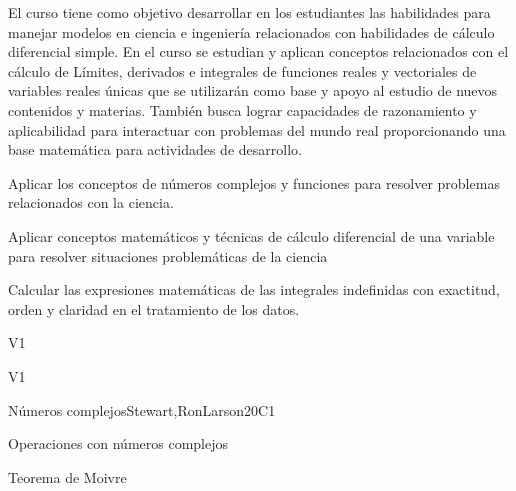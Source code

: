\begin{syllabus}


\begin{justification}
El curso tiene como objetivo desarrollar en los estudiantes las habilidades para manejar modelos en ciencia e ingeniería relacionados con habilidades de cálculo diferencial simple. En el curso se estudian y aplican conceptos relacionados con el cálculo de Límites, derivados e integrales de funciones reales y vectoriales de variables reales únicas que se utilizarán como base y
apoyo al estudio de nuevos contenidos y materias. También busca lograr capacidades de razonamiento y aplicabilidad para interactuar con problemas del mundo real proporcionando una base matemática para actividades de desarrollo.
\end{justification}

\begin{goals}
\item Aplicar los conceptos de números complejos y funciones para resolver problemas relacionados con la ciencia.
\item Aplicar conceptos matemáticos y técnicas de cálculo diferencial de una variable para resolver situaciones problemáticas de la ciencia
\item Calcular las expresiones matemáticas de las integrales indefinidas con exactitud, orden y claridad en el tratamiento de los datos.
\end{goals}

\begin{outcomes}{V1}
    \item {}
    \item {}
\end{outcomes}

\begin{competences}{V1}
    \item {}
    \item {}
    \item {}
\end{competences}

\begin{unit}{Números complejos}{}{Stewart,RonLarson}{20}{C1}
   \begin{topics}
    \item Operaciones con números complejos
    \item Teorema de Moivre 
   \end{topics}


\end{unit}
\end{syllabus}
